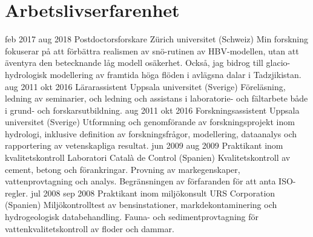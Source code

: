 \ifswedish
  \section{Arbetslivserfarenhet}
    \position
      {feb 2017 \textemdash{} aug 2018}
      {Postdoctorsforskare}
      {Zürich universitet (Schweiz)}
      {Min forskning fokuserar på att förbättra realismen av snö-rutinen av HBV-modellen, utan att äventyra den betecknande låg modell osäkerhet. Också, jag bidrog till glacio-hydrologisk modellering av framtida höga flöden i avlägsna dalar i Tadzjikistan.}
    \position
      {aug 2011 \textemdash{} okt 2016}
      {Lärarassistent}
      {Uppsala universitet (Sverige)}
      {Föreläsning, ledning av seminarier, och ledning och assistans i laboratorie- och fältarbete både i grund- och forskarsutbildning.}
    \position
      {aug 2011 \textemdash{} okt 2016}
      {Forskningsassistent}
      {Uppsala universitet (Sverige)}
      {Utformning och genomförande av forskningsprojekt inom hydrologi, inklusive definition av forskningsfrågor, modellering, dataanalys och rapportering av vetenskapliga resultat.}
    \position
      {jun 2009 \textemdash{} aug 2009}
      {Praktikant inom kvalitetskontroll}
      {Laboratori Català de Control (Spanien)}
      {Kvalitetskontroll av cement, betong och förankringar. Provning av markegenskaper, vattenprovtagning och analys. Begränsningen av förfaranden för att anta ISO-regler.}
    \position
      {jul 2008 \textemdash{} sep 2008}
      {Praktikant inom miljökonsult}
      {URS Corporation (Spanien)}
      {Miljökontrolltest av bensinstationer, markdekontaminering och hydrogeologisk databehandling. Fauna- och sedimentprovtagning för vattenkvalitetskontroll av floder och dammar.}
\else
